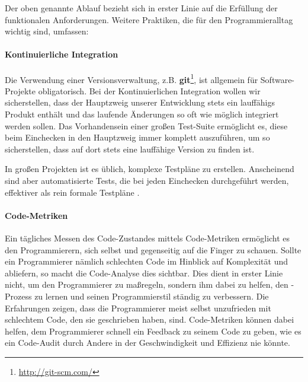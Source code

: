 Der oben genannte Ablauf bezieht sich in erster Linie auf die Erfüllung der funktionalen Anforderungen. Weitere Praktiken, die für den Programmieralltag wichtig sind, umfassen:

\paragraph{Kontinuierliche Integration} Die Verwendung einer Versionsverwaltung, z.B. \textbf{git}\footnote{\url{http://git-scm.com/}}, ist allgemein für Software-Projekte obligatorisch. Bei der Kontinuierlichen Integration wollen wir sicherstellen, dass der Hauptzweig unserer Entwicklung stets ein lauffähigs Produkt enthält und das laufende Änderungen so oft wie möglich integriert werden sollen. Das Vorhandensein einer großen Test-Suite ermöglicht es, diese beim Einchecken in den Hauptzweig immer komplett auszuführen, um so sicherstellen, dass auf dort stets eine lauffähige Version zu finden ist.

In großen Projekten ist es üblich, komplexe Testpläne zu erstellen. Anscheinend sind aber automatisierte Tests, die bei jeden Einchecken durchgeführt werden, effektiver als rein formale Testpläne \citep[S. 238]{hunt_pragmatic_1999}.

\paragraph{Code-Metriken} Ein tägliches Messen des Code-Zustandes mittels Code-Metriken ermöglicht es den Programmierern, sich selbst und gegenseitig auf die Finger zu schauen. Sollte ein Programmierer nämlich schlechten Code im Hinblick auf Komplexität und  abliefern, so macht die Code-Analyse dies sichtbar. Dies dient in erster Linie nicht, um den Programmierer zu maßregeln, sondern ihm dabei zu helfen, den -Prozess zu lernen und seinen Programmierstil ständig zu verbessern. Die Erfahrungen zeigen, dass die Programmierer meist selbst unzufrieden mit schlechtem Code, den sie geschrieben haben, sind. Code-Metriken können dabei helfen, dem Programmierer schnell ein Feedback zu seinem Code zu geben, wie es ein Code-Audit durch Andere in der Geschwindigkeit und Effizienz nie könnte.

